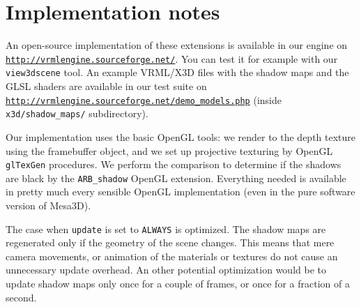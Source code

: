 \documentclass{acmsiggraph}                     %
\newenvironment{mycode}
{\begin{mycodecore}}
{\end{mycodecore}
\vspace{-0.1in}}
\newcommand*{\myhref}[2]{\texttt{\href{#1}{\nolinkurl{#2}}}}
\begin{document}



\section{Implementation notes}

An open-source implementation of these extensions is available in our engine on
\myhref{http://vrmlengine.sourceforge.net/}{http://vrmlengine.sourceforge.net/}.
You can test it for example with our \texttt{view3dscene} tool.
An example VRML/X3D files with the shadow maps and the GLSL shaders are available in our test suite
on \myhref{http://vrmlengine.sourceforge.net/demo\_models.php}{http://vrmlengine.sourceforge.net/demo_models.php}
(inside \texttt{x3d/shadow\_maps/} subdirectory).

Our implementation uses the basic OpenGL tools: we render to the depth
texture using the framebuffer object, and we set up projective texturing
by OpenGL \texttt{glTexGen} procedures.
We perform the comparison to determine if the shadows are black by the
\texttt{ARB\_shadow} OpenGL extension.
Everything needed is available in pretty much every sensible OpenGL
implementation (even in the pure software version of Mesa3D).

The case when \texttt{update} is set to \texttt{ALWAYS} is optimized.
The shadow maps are regenerated
only if the geometry of the scene changes. This means that mere camera
movements, or animation of the materials or textures do not cause
an unnecessary update overhead.
An other potential optimization would be to
update shadow maps only once for a couple of frames, or once for
a fraction of a second.
\end{document}
